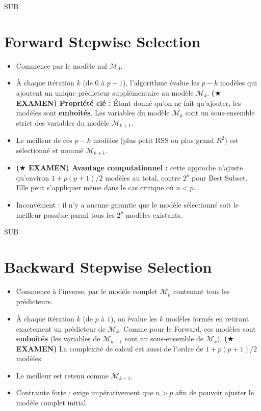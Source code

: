 SUB\section*{Forward Stepwise Selection}
\begin{itemize}
    \item Commence par le modèle nul $\mathcal{M}_0$.
    \item À chaque itération $k$ (de $0$ à $p-1$), l'algorithme évalue les $p-k$ modèles qui ajoutent un unique prédicteur supplémentaire au modèle $\mathcal{M}_k$. \textbf{($\bigstar$ EXAMEN) Propriété clé :} Étant donné qu'on ne fait qu'ajouter, les modèles sont \textbf{emboîtés}. Les variables du modèle $\mathcal{M}_k$ sont un sous-ensemble strict des variables du modèle $\mathcal{M}_{k+1}$.
    \item Le meilleur de ces $p-k$ modèles (plus petit RSS ou plus grand $R^2$) est sélectionné et nommé $\mathcal{M}_{k+1}$.
    \item \textbf{($\bigstar$ EXAMEN) Avantage computationnel :} cette approche n'ajuste qu'environ $1 + p(p+1)/2$ modèles au total, contre $2^p$ pour Best Subset. Elle peut s'appliquer même dans le cas critique où $n < p$.
    \item Inconvénient : il n'y a aucune garantie que le modèle sélectionné soit le meilleur possible parmi tous les $2^p$ modèles existants.
\end{itemize}

SUB\section*{Backward Stepwise Selection}
\begin{itemize}
    \item Commence à l'inverse, par le modèle complet $\mathcal{M}_p$ contenant tous les prédicteurs.
    \item À chaque itération $k$ (de $p$ à $1$), on évalue les $k$ modèles formés en retirant exactement un prédicteur de $\mathcal{M}_k$. Comme pour le Forward, ces modèles sont \textbf{emboîtés} (les variables de $\mathcal{M}_{k-1}$ sont un sous-ensemble de $\mathcal{M}_k$). \textbf{($\bigstar$ EXAMEN)} La complexité de calcul est aussi de l'ordre de $1 + p(p+1)/2$ modèles.
    \item Le meilleur est retenu comme $\mathcal{M}_{k-1}$.
    \item Contrainte forte : exige impérativement que $n > p$ afin de pouvoir ajuster le modèle complet initial.
\end{itemize}

